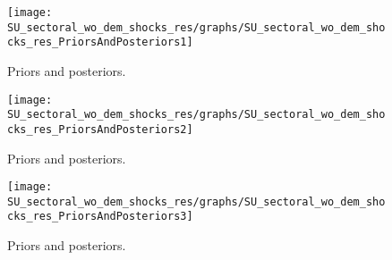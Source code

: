  
\begin{figure}[H]
\centering
\texttt{[image: SU\_sectoral\_wo\_dem\_shocks\_res/graphs/SU\_sectoral\_wo\_dem\_shocks\_res\_PriorsAndPosteriors1]}
\caption{Priors and posteriors.}\label{Fig:PriorsAndPosteriors:1}
\end{figure}
 
\begin{figure}[H]
\centering
\texttt{[image: SU\_sectoral\_wo\_dem\_shocks\_res/graphs/SU\_sectoral\_wo\_dem\_shocks\_res\_PriorsAndPosteriors2]}
\caption{Priors and posteriors.}\label{Fig:PriorsAndPosteriors:2}
\end{figure}
 
\begin{figure}[H]
\centering
\texttt{[image: SU\_sectoral\_wo\_dem\_shocks\_res/graphs/SU\_sectoral\_wo\_dem\_shocks\_res\_PriorsAndPosteriors3]}
\caption{Priors and posteriors.}\label{Fig:PriorsAndPosteriors:3}
\end{figure}
 
